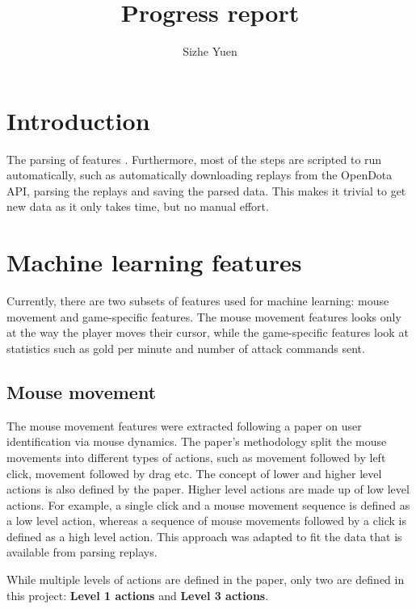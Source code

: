 \documentclass{../sty/SizheArticle}
\title{Progress report}
\author{Sizhe Yuen}
\begin{document}

\section{Introduction}
The parsing of features . Furthermore, most of the steps are scripted to run automatically, such as automatically downloading replays from the OpenDota API, parsing the replays and saving the parsed data. This makes it trivial to get new data as it only takes time, but no manual effort. 

\section{Machine learning features}
Currently, there are two subsets of features used for machine learning: mouse movement and game-specific features. The mouse movement features looks only at the way the player moves their cursor, while the game-specific features look at statistics such as gold per minute and number of attack commands sent. 

\subsection{Mouse movement}
The mouse movement features were extracted following a paper \cite{mouse-dynamics} on user identification via mouse dynamics. The paper's methodology split the mouse movements into different types of actions, such as movement followed by left click, movement followed by drag etc. The concept of lower and higher level actions is also defined by the paper. Higher level actions are made up of low level actions. For example, a single click and a mouse movement sequence is defined as a low level action, whereas a sequence of mouse movements followed by a click is defined as a high level action. This approach was adapted to fit the data that is available from parsing replays.

While multiple levels of actions are defined in the paper, only two are defined in this project: \textbf{Level 1 actions} and \textbf{Level 3 actions}.
\end{document}

